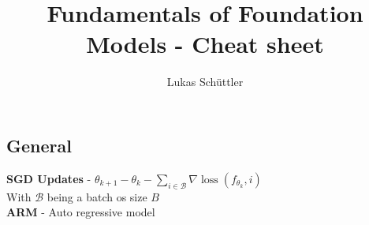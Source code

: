 

\title{Fundamentals of Foundation Models - Cheat sheet}
\author{Lukas Schüttler}
\pagestyle{empty}


\maketitle
\thispagestyle{empty}
\begin{multicols}{2}
    \section{General}
    \begin{mdframed}[style=eqbox]
        \textbf{SGD Updates} - $\theta_{k+1} - \theta_{k} - \sum_{i \in \mathcal{B}} \nabla \operatorname{loss}(f_{\theta_k}, i)$\\
        {\tiny With $\mathcal{B}$ being a batch os size $B$}\\
        \textbf{ARM} - Auto regressive model
    \end{mdframed}

\end{multicols}
